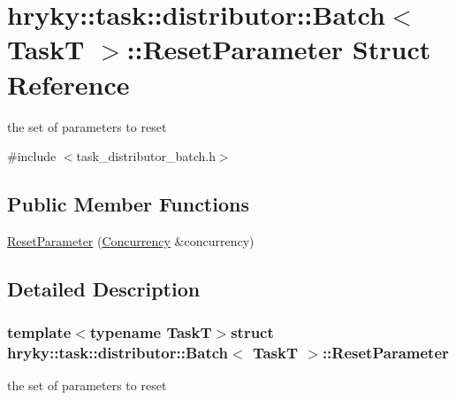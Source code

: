 \hypertarget{structhryky_1_1task_1_1distributor_1_1_batch_1_1_reset_parameter}{\section{hryky\-:\-:task\-:\-:distributor\-:\-:Batch$<$ Task\-T $>$\-:\-:Reset\-Parameter Struct Reference}
\label{structhryky_1_1task_1_1distributor_1_1_batch_1_1_reset_parameter}
}


the set of parameters to reset  




{\ttfamily \#include $<$task\-\_\-distributor\-\_\-batch.\-h$>$}

\subsection*{Public Member Functions}
\begin{DoxyCompactItemize}
\item 
\hyperlink{structhryky_1_1task_1_1distributor_1_1_batch_1_1_reset_parameter_a997df3dab45c5ef82f3d26ca532380ab}{Reset\-Parameter} (\hyperlink{classhryky_1_1task_1_1_concurrency}{Concurrency} \&concurrency)
\end{DoxyCompactItemize}


\subsection{Detailed Description}
\subsubsection*{template$<$typename Task\-T$>$struct hryky\-::task\-::distributor\-::\-Batch$<$ Task\-T $>$\-::\-Reset\-Parameter}

the set of parameters to reset 

